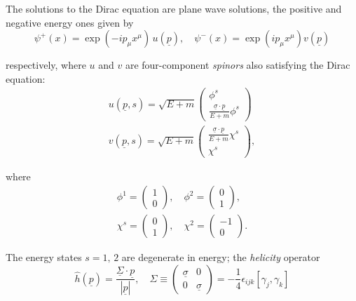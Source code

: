 \documentclass{article}
\begin{document}
The solutions to the Dirac equation are plane wave solutions, the positive and negative energy ones given by
\begin{equation}
    \psi^+(x) = \exp(-ip_\mu x^\mu)\,u(\underline{p}), \quad \psi^-(x) = \exp(ip_\mu x^\mu) v(\underline{p})
\end{equation}

respectively, where $u$ and $v$ are four-component \textit{spinors} also satisfying the Dirac equation:
\begin{gather}
    u(\underline{p}, s) = \sqrt{E+m} \begin{pmatrix}
        \phi^s \\ \frac{\underline{\sigma} \cdot \underline{p}}{E+m} \phi^s
    \end{pmatrix} \\
    v(\underline{p}, s) = \sqrt{E+m} \begin{pmatrix}
        \frac{\underline{\sigma} \cdot \underline{p}}{E+m} \chi^s \\ \chi^s
    \end{pmatrix},
\end{gather}

where 
\begin{gather}
    \phi^1 = \begin{pmatrix}
        1 \\ 0
    \end{pmatrix}, \quad \phi^2 = \begin{pmatrix}
        0 \\ 1
    \end{pmatrix}, \\
    \chi^s = \begin{pmatrix}
        0 \\ 1
    \end{pmatrix}, \quad \chi^2 = \begin{pmatrix}
        -1 \\ 0
    \end{pmatrix}.
\end{gather}

The energy states $s=1,\, 2$ are degenerate in energy; the \textit{helicity} operator
\begin{equation}
    \hat{h}(\underline{p}) = \frac{\underline{\Sigma} \cdot \underline{p}}{|\underline{p}|}, \quad \Sigma \equiv \begin{pmatrix}
        \underline{\sigma} & 0 \\ 0 & \underline{\sigma}
    \end{pmatrix} = -\frac{1}{4} \epsilon_{ijk} [\gamma_j, \gamma_k]
\end{equation}
\end{document}
